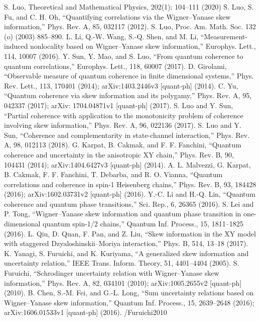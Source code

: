 \begin{thebibliography}{}
 S. Luo, Theoretical and Mathematical Physics, 202(1): 104–111 (2020)
 S. Luo, S. Fu, and C. H. Oh, “Quantifying correlations via the Wigner–Yanase skew information,” Phys. Rev. A,
85, 032117 (2012).
 S. Luo, Proc. Am. Math. Soc. 132 (o) (2003) 885–890.
 L. Li, Q.-W. Wang, S.-Q. Shen, and M. Li, “Measurement-induced nonlocality based on Wigner–Yanase skew
information,” Europhys. Lett., 114, 10007 (2016).
 Y. Sun, Y. Mao, and S. Luo, “From quantum coherence to quantum correlations,” Europhys. Lett., 118, 60007
(2017).
 D. Girolami, “Observable measure of quantum coherence in finite dimensional systems,” Phys. Rev. Lett., 113,
170401 (2014); arXiv:1403.2446v3 [quant-ph] (2014).
 C. Yu, “Quantum coherence via skew information and its polygamy,” Phys. Rev. A, 95, 042337 (2017); arXiv:
1704.04871v1 [quant-ph] (2017).
 S. Luo and Y. Sun, “Partial coherence with application to the monotonicity problem of coherence involving skew
information,” Phys. Rev. A, 96, 022136 (2017).
 S. Luo and Y. Sun, “Coherence and complementarity in state-channel interaction,” Phys. Rev. A, 98, 012113
(2018).
 G. Karpat, B. Cakmak, and F. F. Fanchini, “Quantum coherence and uncertainty in the anisotropic XY chain,”
Phys. Rev. B, 90, 104431 (2014); arXiv:1404.6427v3 [quant-ph] (2014).
 A. L. Malvezzi, G. Karpat, B. Cakmak, F. F. Fanchini, T. Debarba, and R. O. Vianna, “Quantum correlations
and coherence in spin-1 Heisenberg chains,” Phys. Rev. B, 93, 184428 (2016); arXiv:1602.03731v2 [quant-ph]
(2016).
 Y.-C. Li and H.-Q. Lin, “Quantum coherence and quantum phase transitions,” Sci. Rep., 6, 26365 (2016).
 S. Lei and P. Tong, “Wigner–Yanase skew information and quantum phase transition in one-dimensional quantum spin-1/2 chains,” Quantum Inf. Process., 15, 1811–1825 (2016).
 L. Qiu, D. Quan, F. Pan, and Z. Liu, “Skew information in the XY model with staggered Dzyaloshinskii–Moriya
interaction,” Phys. B, 514, 13–18 (2017).
 K. Yanagi, S. Furuichi, and K. Kuriyama, “A generalized skew information and uncertainty relation,” IEEE Trans. Inform. Theory, 51, 4401–4404 (2005).
 S. Furuichi, “Schrodinger uncertainty relation with Wigner–Yanase skew information,” Phys. Rev. A, 82, 034101 (2010); arXiv:1005.2655v2 [quant-ph] (2010).
 B. Chen, S.-M. Fei, and G.-L. Long, “Sum uncertainty relations based on Wigner–Yanase skew information,” Quantum Inf. Process., 15, 2639–2648 (2016); arXiv:1606.01533v1 [quant-ph] (2016).
/Furuichi2010



\end{thebibliography}
